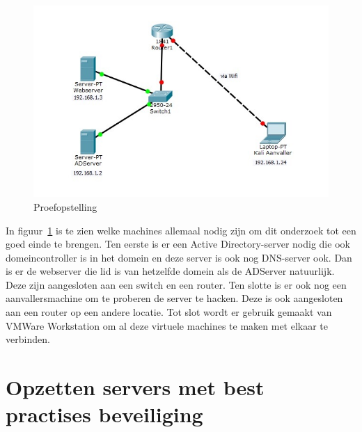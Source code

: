 \documentclass[pdftex,a4paper,12pt]{report}
\begin{document}
\begin{figure}[H]
\begin{center}
\includegraphics{img/Situatie}
\end{center}
\label{img:situatie}
\caption{Proefopstelling}
\end{figure}

In figuur~\ref{img:situatie} is te zien welke machines allemaal nodig zijn om dit onderzoek tot een goed einde te brengen. Ten eerste is er een Active Directory-server nodig die ook domeincontroller is in het domein en deze server is ook nog DNS-server ook. Dan is er de webserver die lid is van hetzelfde domein als de ADServer natuurlijk. Deze zijn aangesloten aan een switch en een router. Ten slotte is er ook nog een aanvallersmachine om te proberen de server te hacken. Deze is ook aangesloten aan een router op een andere locatie. Tot slot wordt er gebruik gemaakt van VMWare Workstation om al deze virtuele machines te maken met elkaar te verbinden.

\chapter{Opzetten servers met best practises beveiliging}
\end{document}
